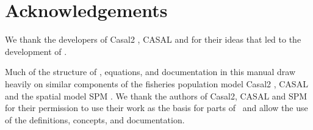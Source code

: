 \section{Acknowledgements\label{sec:acknowledgements}}

We thank the developers of Casal2 \citep{CASAL2}, CASAL \citep{1388} and \citep{SPM} for their ideas that led to the development of \IBM. 

Much of the structure of \IBM, equations, and documentation in this manual draw heavily on similar components of the fisheries population model Casal2 \citep{CASAL2}, CASAL \citep{1388} and  the spatial model SPM \citep{SPM}. We thank the authors of Casal2, CASAL and SPM for their permission to use their work as the basis for parts of \IBM\ and allow the use of the definitions, concepts, and documentation. 

